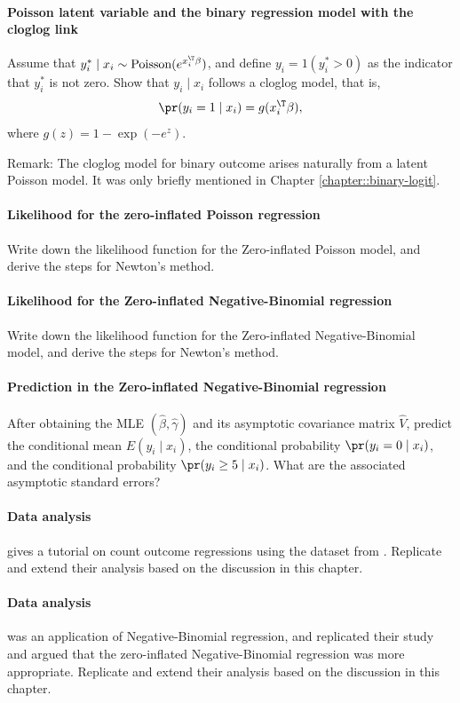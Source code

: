 \paragraph{Poisson latent variable and the binary regression model with the cloglog link}\label{hw19::poisson-logistic}

Assume that $y_{i}^* \mid x_{i}\sim\text{Poisson}(e^{x_{i}^{\T}\beta})$,
and define $y_{i}=1(y_{i}^*>0)$ as the indicator that $y_{i}^*$ is
not zero. Show that $y_{i} \mid x_{i}$ follows a cloglog model, that
is,
\[
\pr(y_{i} =1\mid x_{i})=g(x_{i}^{\T}\beta),
\]
where $g(z)=1-\exp(-e^{z})$. 

Remark: The cloglog model for binary outcome arises naturally from a latent Poisson model. It was only briefly mentioned in Chapter \ref{chapter::binary-logit}. 



\paragraph{Likelihood for the zero-inflated Poisson regression}

Write down the likelihood function for the Zero-inflated Poisson model,
and derive the steps for Newton's method. 

\paragraph{Likelihood for the Zero-inflated Negative-Binomial regression}

Write down the likelihood function for the Zero-inflated Negative-Binomial model, and
derive the steps for Newton's method. 


\paragraph{Prediction in the Zero-inflated Negative-Binomial regression}

After obtaining the MLE $(\hat{\beta}, \hat{\gamma})$ and its asymptotic covariance matrix $\hat{V}$, predict the conditional mean $E(y_i \mid x_i)$, the conditional probability $\pr(y_i=0\mid x_i)$, and the conditional probability $\pr(y_i \geq 5\mid x_i)$. What are the associated asymptotic standard errors? 


\paragraph{Data analysis}

\citet{zeileis2008regression} gives a tutorial on count outcome regressions using the dataset from \citet{deb1997demand}. Replicate and extend their analysis based on the discussion in this chapter. 
 
 
\paragraph{Data analysis} 


\citet{fisman2007corruption} was an application of Negative-Binomial regression, and \citet{albergaria2017narrow} replicated their study and argued that the zero-inflated Negative-Binomial regression was more appropriate. Replicate and extend their analysis based on the discussion in this chapter. 
